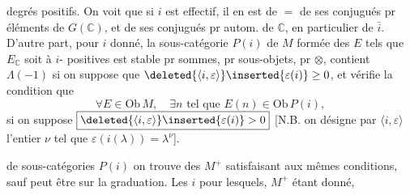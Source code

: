 degrés positifs. On voit que si $i$ est effectif, il en est de $=$ de ses conjugués pr éléments de $G(\mathbb{C})$, et de ses conjugués pr autom. de $\mathbb{C}$, en particulier de $\bar i$. D'autre part, pour $i$ donné, la sous-catégorie  $P(i)$ de $M$ formée des $E$ tels que $E_{\mathbb{C}}$ soit à $i$- positives est  stable pr \deleted{$\unsure{\otimes}$} sommes, pr  sous-objets, pr $\otimes$, contient  $\Lambda(-1)$ si on suppose que  $\deleted{\langle i,\varepsilon\rangle}\inserted{\varepsilon(i)}\geq0$, et vérifie la condition que
\[
\forall E\in\mathrm{Ob}\,M,\quad \exists n\text{ tel que }E(n)\in\mathrm{Ob}\,P(i),
\]
si on suppose $\boxed{\deleted{\langle i,\varepsilon\rangle}\inserted{\varepsilon(i)}>0}$ [N.B. on désigne par $\langle i,\varepsilon\rangle$ l'entier $\nu$ tel que $\varepsilon(i(\lambda))=\lambda^\nu$].

 de sous-catégories $P(i)$ on trouve des $M^+$ satisfaisant aux mêmes conditions, sauf peut être  sur la graduation.
Les $i$ pour lesquels, $M^+$ étant donné,

